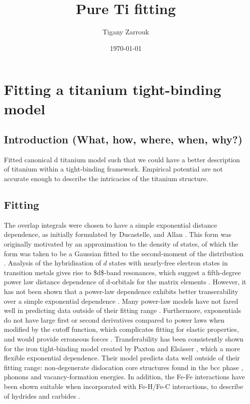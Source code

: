 \documentclass[11pt]{article}
\author{Tigany Zarrouk}
\date{\today}
\title{Pure Ti fitting}
\begin{document}
\maketitle
\tableofcontents


\section{Fitting a titanium tight-binding model}
\label{sec:org41025e0}
\label{ch:ti_fitting}
\subsection{Introduction (What, how, where, when, why?)}
\label{sec:orge068ceb}
Fitted canonical d titanium model such that we could have a better
description of titanium within a tight-binding framework. Empirical
potential are not accurate enough to describe the intricacies of the
titanium structure.

\subsection{Fitting}
\label{sec:org711ffe9}

The overlap integrals were chosen to have a simple exponential
distance dependence, as initially formulated by Ducastelle,
\cite{Ducastelle1970c} and Allan \cite{Allan1976}. This form was
originally motivated by an approximation to the density of states,
of which the form was taken to be a Gaussian fitted to the
second-moment of the distribution \cite{Spanjaard1984}. Analysis of
the hybridisation of \(d\) states with nearly-free electron states in
transition metals gives rise to \$d\$-band resonances, which suggest a
fifth-degree power law distance dependence of d-orbitals for the
matrix elements
\cite{Heine1967,Heine1980,Andersen1985,Harrison1989,Pettifor1995}. However, it has
not been shown that a power-law dependence exhibits better
transerability over a simple exponential dependence
\cite{Skinner1991,Paxton2010}. Many power-law models have not
fared well in predicting data outside of their fitting range
\cite{Paxton1987,Paxton1989,Girshick1998a,Trinkle2006,Ferrari2019a}. Furthermore,
exponentials do not have large first or second derivatives compared
to power laws when modified by the cutoff function, which
complicates fitting for elastic properties, and would provide
erroneous forces
\cite{Pashov2012}. Transferability has been consistently
shown for the iron tight-binding model created by Paxton and
Elsässer \cite{Paxton2010}, which a more flexible exponential
dependence. Their model predicts data well outside of their fitting
range: non-degenerate dislocation core structures found in the bcc
phase \cite{Simpsonb,Simpson2020}, phonons and vacancy-formation
energies. In addition, the Fe-Fe interactions have been shown
suitable when incorporated with Fe-H/Fe-C interactions, to describe
of hydrides and carbides \cite{Paxton2010,Paxton2013}.
\end{document}

